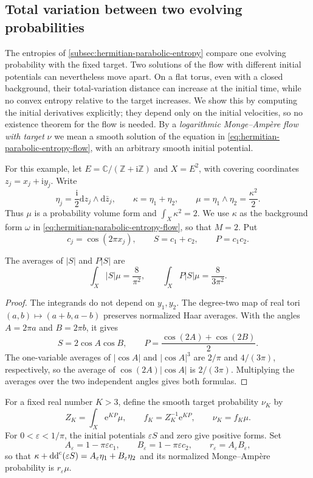\subsection{Total variation between two evolving probabilities}
\label{subsec:parabolic-total-variation-growth}

The entropies of \cref{subsec:hermitian-parabolic-entropy} compare one evolving probability with the fixed target. Two solutions of the flow with different initial potentials can nevertheless move apart. On a flat torus, even with a closed background, their total-variation distance can increase at the initial time, while no convex entropy relative to the target increases. We show this by computing the initial derivatives explicitly; they depend only on the initial velocities, so no existence theorem for the flow is needed. By a \emph{logarithmic Monge--Amp\`ere flow with target} $\nu$ we mean a smooth solution of the equation in \eqref{eq:hermitian-parabolic-entropy-flow}, with an arbitrary smooth initial potential.

For this example, let $E=\mathbb C/(\mathbb Z+\mathrm i\mathbb Z)$ and $X=E^2$, with covering coordinates $z_j=x_j+\mathrm i y_j$. Write
\[
 \eta_j=\frac{\mathrm i}2\mathrm dz_j\wedge\mathrm d\bar z_j,
 \qquad \kappa=\eta_1+\eta_2,
 \qquad \mu=\eta_1\wedge\eta_2=\frac{\kappa^2}2.
\]
Thus $\mu$ is a probability volume form and $\int_X\kappa^2=2$. We use $\kappa$ as the background form $\omega$ in \eqref{eq:hermitian-parabolic-entropy-flow}, so that $M=2$. Put
\[
 c_j=\cos(2\pi x_j),\qquad S=c_1+c_2,\qquad P=c_1c_2.
\]

\begin{lemma}\label{lem:torus-total-variation-averages}
The averages of $|S|$ and $P|S|$ are
\[
 \int_X|S|\mu=\frac8{\pi^2},
 \qquad \int_XP|S|\mu=\frac8{3\pi^2}.
\]
\end{lemma}
\begin{proof}
The integrands do not depend on $y_1,y_2$. The degree-two map of real tori $(a,b)\mapsto(a+b,a-b)$ preserves normalized Haar averages. With the angles $A=2\pi a$ and $B=2\pi b$, it gives
\[
 S=2\cos A\cos B,\qquad
 P=\frac{\cos(2A)+\cos(2B)}2.
\]
The one-variable averages of $|\cos A|$ and $|\cos A|^3$ are $2/\pi$ and $4/(3\pi)$, respectively, so the average of $\cos(2A)|\cos A|$ is $2/(3\pi)$. Multiplying the averages over the two independent angles gives both formulas.
\end{proof}

For a fixed real number $K>3$, define the smooth target probability $\nu_K$ by
\[
 Z_K=\int_X\mathrm e^{KP}\mu,
 \qquad f_K=Z_K^{-1}\mathrm e^{KP},
 \qquad \nu_K=f_K\mu.
\]
For $0<\varepsilon<1/\pi$, the initial potentials $\varepsilon S$ and zero give positive forms. Set
\[
 A_\varepsilon=1-\pi\varepsilon c_1,
 \qquad B_\varepsilon=1-\pi\varepsilon c_2,
 \qquad r_\varepsilon=A_\varepsilon B_\varepsilon,
\]
so that $\kappa+\mathrm{dd}^{\mathrm{c}}(\varepsilon S)=A_\varepsilon\eta_1+B_\varepsilon\eta_2$ and its normalized Monge--Amp\`ere probability is $r_\varepsilon\mu$.

